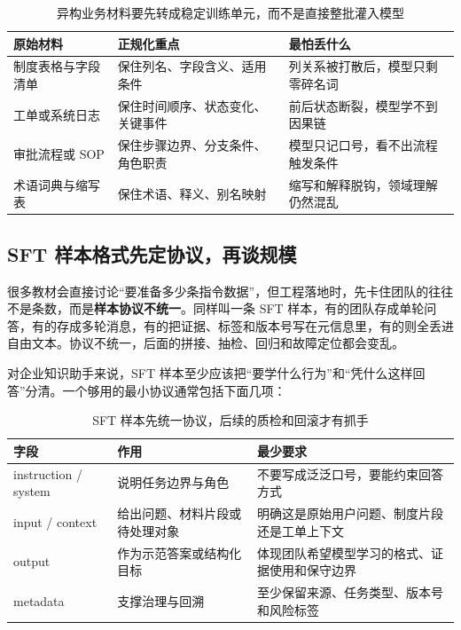 \begin{table}[H]
\centering
\small
\begin{tabularx}{\textwidth}{>{\raggedright\arraybackslash}p{3cm}>{\raggedright\arraybackslash}p{3.2cm}>{\raggedright\arraybackslash}X}
\toprule
\textbf{原始材料} & \textbf{正规化重点} & \textbf{最怕丢什么} \\
\midrule
制度表格与字段清单 & 保住列名、字段含义、适用条件 & 列关系被打散后，模型只剩零碎名词 \\
工单或系统日志 & 保住时间顺序、状态变化、关键事件 & 前后状态断裂，模型学不到因果链 \\
审批流程或 SOP & 保住步骤边界、分支条件、角色职责 & 模型只记口号，看不出流程触发条件 \\
术语词典与缩写表 & 保住术语、释义、别名映射 & 缩写和解释脱钩，领域理解仍然混乱 \\
\bottomrule
\end{tabularx}
\caption{异构业务材料要先转成稳定训练单元，而不是直接整批灌入模型}
\label{tab:heterogeneous-normalization}
\end{table}

\subsection{SFT 样本格式先定协议，再谈规模}
很多教材会直接讨论“要准备多少条指令数据”，但工程落地时，先卡住团队的往往不是条数，而是\textbf{样本协议不统一}。同样叫一条 SFT 样本，有的团队存成单轮问答，有的存成多轮消息，有的把证据、标签和版本号写在元信息里，有的则全丢进自由文本。协议不统一，后面的拼接、抽检、回归和故障定位都会变乱。

对企业知识助手来说，SFT 样本至少应该把“要学什么行为”和“凭什么这样回答”分清。一个够用的最小协议通常包括下面几项：
\begin{table}[H]
\centering
\small
\begin{tabularx}{\textwidth}{>{\raggedright\arraybackslash}p{2.6cm}>{\raggedright\arraybackslash}p{3cm}>{\raggedright\arraybackslash}X}
\toprule
\textbf{字段} & \textbf{作用} & \textbf{最少要求} \\
\midrule
instruction / system & 说明任务边界与角色 & 不要写成泛泛口号，要能约束回答方式 \\
input / context & 给出问题、材料片段或待处理对象 & 明确这是原始用户问题、制度片段还是工单上下文 \\
output & 作为示范答案或结构化目标 & 体现团队希望模型学习的格式、证据使用和保守边界 \\
metadata & 支撑治理与回溯 & 至少保留来源、任务类型、版本号和风险标签 \\
\bottomrule
\end{tabularx}
\caption{SFT 样本先统一协议，后续的质检和回滚才有抓手}
\label{tab:sft-schema}
\end{table}

